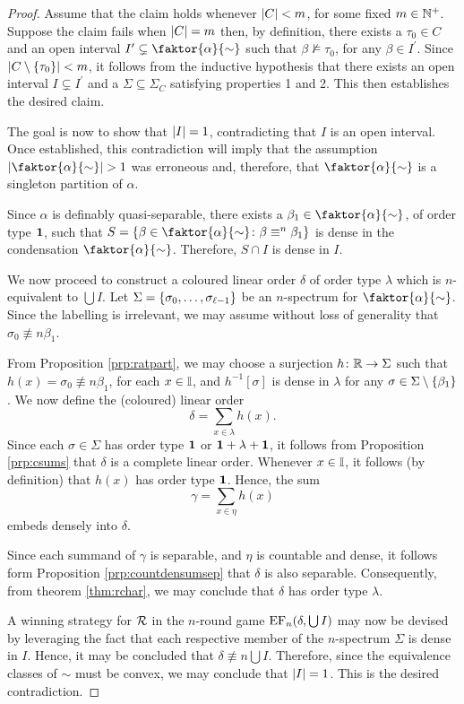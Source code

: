 \begin{proof}
	Assume that the claim holds whenever $\left\lvert C\right\rvert<m$, for some fixed
	$m\in\mathbb{N}^{+}$.  Suppose the claim fails when $\left\lvert C\right\rvert=m$ then, by definition,
	there exists a $\tau_0\in C$ and an open interval
	$I^\prime\subsetneq\faktor{\alpha}{\sim}$ such that
	$\beta\not\models\tau_0$, for any $\beta\in I^\prime$.  Since
	$\left\lvert C\setminus\left\lbrace \tau_0\right\rbrace\right\rvert<m$, it follows from the inductive hypothesis that
	there exists an open interval $I\subsetneq I^\prime$ and a
	$\Sigma\subseteq\Sigma_C$ satisfying properties 1 and 2.  This then
	establishes the desired claim.

	\smallskip	The goal is now to show that $\left\lvert I\right\rvert=1$, contradicting that
	$I$ is an open interval.  Once established, this contradiction will imply
	that the assumption $\card{\faktor{\alpha}{\sim}}>1$ was erroneous and,
	therefore, that $\faktor{\alpha}{\sim}$ is a singleton partition of
	$\alpha$.

	Since $\alpha$ is definably quasi-separable, there exists a
	$\beta_1\in\faktor{\alpha}{\sim}$, of order type $\mathbf{1}$, such that
	$S=\setbuild{\beta\in\faktor{\alpha}{\sim}}{\beta\nequiv{n}\beta_1}$ is dense in
	the condensation $\faktor{\alpha}{\sim}$.  Therefore, $S\cap I$ is dense in $I$.

	We now proceed to construct a coloured linear order $\delta$ of order type
	$\lambda$ which is $n$-equivalent to $\bigcup I$.  Let
	$\Sigma=\left\lbrace \sigma_0,\dotsc,\sigma_{\ell-1}\right\rbrace$ be an $n$-spectrum for
	$\faktor{\alpha}{\sim}$.  Since the labelling is irrelevant, we may assume
	without loss of generality that $\sigma_{0}\nequiv{n}\beta_{1}$.

	From Proposition \ref{prp:ratpart}, we may choose a surjection
	$h\colon\mathbb{R}\to\Sigma$ such that $h(x)=\sigma_0\nequiv{n}\beta_1$, for each
	$x\in\mathbb{I}$, and $h^{-1}[\sigma]$ is dense in $\lambda$ for any
	$\sigma\in\Sigma\setminus\left\lbrace \beta_1\right\rbrace$. We now define the (coloured) linear
	order
	\begin{equation}
		\delta=\sum_{x\in\lambda}h(x).
	\end{equation}
	Since each $\sigma\in\Sigma$ has order type $\mathbf{1}$ or $\mathbf{1}+\lambda+\mathbf{1}$,
	it follows from Proposition \ref{prp:csums} that $\delta$ is a complete
	linear order.  Whenever $x\in\mathbb{I}$, it follows (by definition) that
	$h(x)$ has order type $\mathbf{1}$.  Hence, the sum
	\begin{equation}
		\gamma=\sum_{x\in\eta}h(x)
	\end{equation}
	embeds densely into $\delta$.

	Since each summand of $\gamma$ is separable, and $\eta$ is countable and
	dense, it follows form Proposition \ref{prp:countdensumsep} that $\delta$ is
	also separable.  Consequently, from theorem \ref{thm:rchar}, we may conclude
	that $\delta$ has order type $\lambda$.

	A winning strategy for $\mathcal{R}$ in the $n$-round game
	$\operatorname{EF}_{n}(\delta,\bigcup I)$ may now be devised by leveraging the fact that each
	respective member of the $n$-spectrum $\Sigma$ is dense in $I$.  Hence, it
	may be concluded that $\delta\nequiv{n}\bigcup I$. Therefore, since the
	equivalence classes of $\sim$ must be convex, we may conclude that
	$\left\lvert I\right\rvert=1$.  This is the desired contradiction.
\end{proof}
